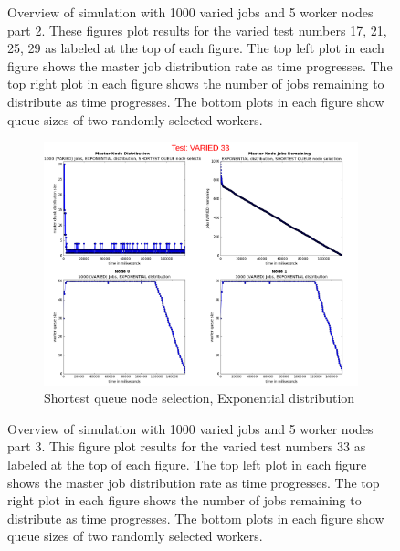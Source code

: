 \documentclass{article}
\begin{document}
\begin{figure}[p]
  
  \caption{Overview of simulation with 1000 varied jobs and 5 worker nodes part 2. These figures plot results for the varied test numbers 17, 21, 25, 29 as labeled at the top of each figure. The top left plot in each figure shows the master job distribution rate as time progresses. The top right plot in each figure shows the number of jobs remaining to distribute as time progresses. The bottom plots in each figure show queue sizes of two randomly selected workers.}
  \label{testsVaried17-29} 
  
\end{figure}

\begin{figure} 
\hspace*{9em}
\begin{subfigure}[b]{0.5\linewidth}
    \centering
    \includegraphics[scale=0.20]{combined_varied_overview/case_varied_33} 
    \caption{Shortest queue node selection, Exponential distribution} 
    \label{testVaried33} 
  \end{subfigure}

  \caption{Overview of simulation with 1000 varied jobs and 5 worker nodes part 3. This figure plot results for the varied test numbers 33 as labeled at the top of each figure. The top left plot in each figure shows the master job distribution rate as time progresses. The top right plot in each figure shows the number of jobs remaining to distribute as time progresses. The bottom plots in each figure show queue sizes of two randomly selected workers.}
  \label{testVaried33Figure} 
\end{figure}
\end{document}
